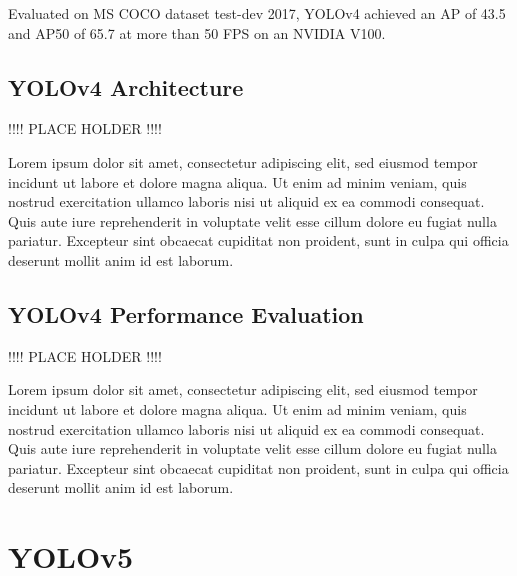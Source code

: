 \documentclass{article}
\begin{document}
Evaluated on MS COCO dataset test-dev 2017, YOLOv4 achieved an AP of 43.5 and AP50 of 65.7 at more than 50
FPS on an NVIDIA V100.

\subsection{YOLOv4 Architecture}

!!!! PLACE HOLDER !!!!

Lorem ipsum dolor sit amet, consectetur adipiscing elit, sed eiusmod tempor incidunt ut labore et dolore magna aliqua. Ut enim ad minim veniam, quis nostrud exercitation ullamco laboris nisi ut aliquid ex ea commodi consequat. Quis aute iure reprehenderit in voluptate velit esse cillum dolore eu fugiat nulla pariatur. Excepteur sint obcaecat cupiditat non proident, sunt in culpa qui officia deserunt mollit anim id est laborum.

\subsection{YOLOv4 Performance Evaluation}

!!!! PLACE HOLDER !!!!

Lorem ipsum dolor sit amet, consectetur adipiscing elit, sed eiusmod tempor incidunt ut labore et dolore magna aliqua. Ut enim ad minim veniam, quis nostrud exercitation ullamco laboris nisi ut aliquid ex ea commodi consequat. Quis aute iure reprehenderit in voluptate velit esse cillum dolore eu fugiat nulla pariatur. Excepteur sint obcaecat cupiditat non proident, sunt in culpa qui officia deserunt mollit anim id est laborum.



\section{YOLOv5}
\end{document}
